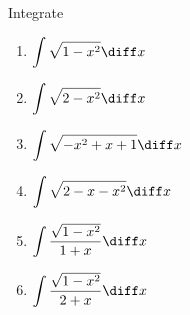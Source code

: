 Integrate
\begin{enumerate}[ref={\fcProblemRef}]
\item  \label{problemintsqrt(1-x^2)dx}
$\displaystyle
\int \sqrt{1-x^2}\diff x$

\answer{$ $}
\item 
$\displaystyle
\int \sqrt{2-x^2}\diff x
$
\item 
$\displaystyle
\int \sqrt{-x^2+x+1}\diff x
$
\item 
$\displaystyle
\int \sqrt{2-x-x^2}\diff x
$

\item \label{problemintsqrt(1-x^2)/(1+x)dx}
$\displaystyle
\int \frac{\sqrt{1-x^2} }{1+x}\diff x
$
\item 
$\displaystyle
\int \frac{\sqrt{1-x^2} }{2+x}\diff x
$
\end{enumerate}
